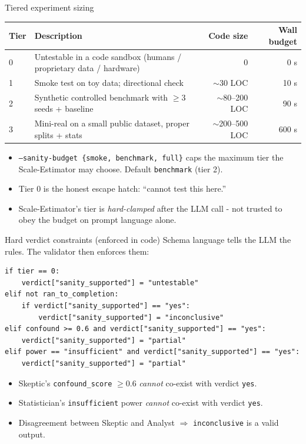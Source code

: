 \documentclass[10pt,aspectratio=169]{beamer}
\newcommand{\flag}[1]{\texttt{\small#1}}
\begin{document}
\begin{frame}{Tiered experiment sizing}
  \scriptsize
  \begin{table}\centering
    \begin{tabular}{@{}l p{5cm} r r@{}}
      \toprule
      Tier & Description & Code size & Wall budget \\
      \midrule
      0 & Untestable in a code sandbox (humans / proprietary data / hardware) & 0 & 0 s   \\
      1 & Smoke test on toy data; directional check                          & $\sim$30 LOC  & 10 s  \\
      2 & Synthetic controlled benchmark with $\geq 3$ seeds + baseline       & $\sim$80--200 LOC & 90 s  \\
      3 & Mini-real on a small public dataset, proper splits + stats         & $\sim$200--500 LOC & 600 s \\
      \bottomrule
    \end{tabular}
  \end{table}

  \vspace{1em}
  \begin{itemize}
    \item \flag{--sanity-budget \{smoke, benchmark, full\}} caps the maximum
      tier the Scale-Estimator may choose. Default \texttt{benchmark} (tier 2).
    \item Tier 0 is the honest escape hatch: ``cannot test this here.''
    \item Scale-Estimator's tier is \emph{hard-clamped} after the LLM call -
      not trusted to obey the budget on prompt language alone.
  \end{itemize}
\end{frame}

\begin{frame}[fragile]{Hard verdict constraints (enforced in code)}
  Schema language tells the LLM the rules. The validator then enforces them:
  \begin{lstlisting}
if tier == 0:
    verdict["sanity_supported"] = "untestable"
elif not ran_to_completion:
    if verdict["sanity_supported"] == "yes":
        verdict["sanity_supported"] = "inconclusive"
elif confound >= 0.6 and verdict["sanity_supported"] == "yes":
    verdict["sanity_supported"] = "partial"
elif power == "insufficient" and verdict["sanity_supported"] == "yes":
    verdict["sanity_supported"] = "partial"
  \end{lstlisting}

  \vspace{0.3em}
  \begin{itemize}
    \item Skeptic's \texttt{confound\_score} $\geq 0.6$ \emph{cannot} co-exist with verdict \texttt{yes}.
    \item Statistician's \texttt{insufficient} power \emph{cannot} co-exist with verdict \texttt{yes}.
    \item Disagreement between Skeptic and Analyst $\Rightarrow$ \texttt{inconclusive} is a valid output.
  \end{itemize}
\end{frame}
\end{document}
